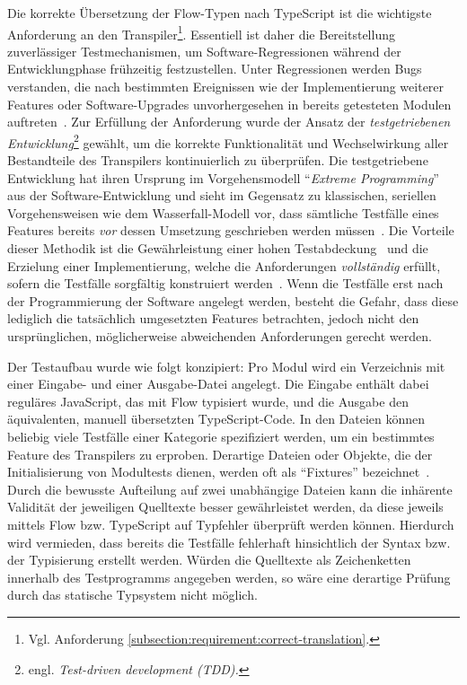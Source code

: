 Die korrekte Übersetzung der Flow-Typen nach TypeScript ist die wichtigste Anforderung an den Transpiler\footnote{Vgl. Anforderung \ref{subsection:requirement:correct-translation}.}. Essentiell ist daher die Bereitstellung zuverlässiger Testmechanismen, um Software-Regressionen während der Entwicklungphase frühzeitig festzustellen. Unter Regressionen werden Bugs verstanden, die nach bestimmten Ereignissen wie der Implementierung weiterer Features oder Software-Upgrades unvorhergesehen in bereits getesteten Modulen auftreten~\autocite[218]{DOR:SOFTWARE_TEST}. Zur Erfüllung der Anforderung wurde der Ansatz der \emph{testgetriebenen Entwicklung}\footnote{engl. \textit{Test-driven development (TDD).}} gewählt, um die korrekte Funktionalität und Wechselwirkung aller Bestandteile des Transpilers kontinuierlich zu überprüfen. Die testgetriebene Entwicklung hat ihren Ursprung im Vorgehensmodell \enquote{\textit{Extreme Programming}}~\autocite{JEFFRIES:EXTREME_PROGRAMMING} aus der Software-Entwicklung und sieht im Gegensatz zu klassischen, seriellen Vorgehensweisen wie dem Wasserfall-Modell vor, dass sämtliche Testfälle eines Features bereits \emph{vor} dessen Umsetzung geschrieben werden müssen~\autocite{BECK:EXTREME_PROGRAMMING}. Die Vorteile dieser Methodik ist die Gewährleistung einer hohen Testabdeckung~\autocite[90]{BECK:TDD} und die Erzielung einer Implementierung, welche die Anforderungen \emph{vollständig} erfüllt, sofern die Testfälle sorgfältig konstruiert werden~\autocite[214]{BECK:TDD}. Wenn die Testfälle erst nach der Programmierung der Software angelegt werden, besteht die Gefahr, dass diese lediglich die tatsächlich umgesetzten Features betrachten, jedoch nicht den ursprünglichen, möglicherweise abweichenden Anforderungen gerecht werden.

Der Testaufbau wurde wie folgt konzipiert: Pro Modul wird ein Verzeichnis mit einer Ein\-gabe- und einer Ausgabe-Datei angelegt. Die Eingabe enthält dabei reguläres JavaScript, das mit Flow typisiert wurde, und die Ausgabe den äquivalenten, manuell übersetzten TypeScript-Code. In den Dateien können beliebig viele Testfälle einer Kategorie spezifiziert werden, um ein bestimmtes Feature des Transpilers zu erproben. Derartige Dateien oder Objekte, die der Initialisierung von Modultests dienen, werden oft als \enquote{Fixtures} bezeichnet~\autocite{OLAN:2003}. Durch die bewusste Aufteilung auf zwei unabhängige Dateien kann die inhärente Validität der jeweiligen Quelltexte besser gewährleistet werden, da diese jeweils mittels Flow bzw. TypeScript auf Typfehler überprüft werden können. Hierdurch wird vermieden, dass bereits die Testfälle fehlerhaft hinsichtlich der Syntax bzw. der Typisierung erstellt werden. Würden die Quelltexte als Zeichenketten innerhalb des Testprogramms angegeben werden, so wäre eine derartige Prüfung durch das statische Typsystem nicht möglich.

